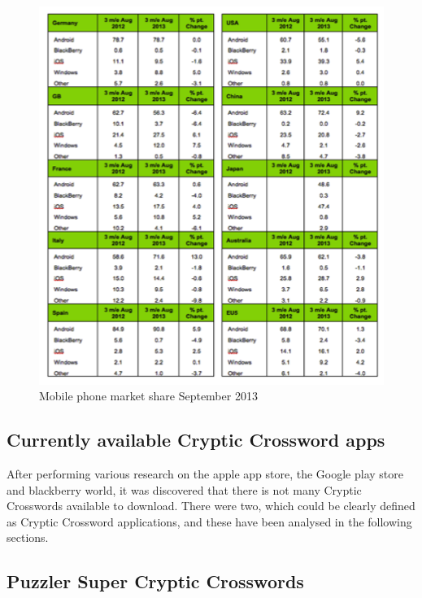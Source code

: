 \newpage
    \begin{figure}[H]
    \includegraphics[width=\linewidth]
        {research/mobile_platforms/forbeslist13.png}
    \caption{Mobile phone market share September 2013}
\end{figure}

\begin{flushright}
\citep{forbes13}
\end{flushright}

\subsection{Currently available Cryptic Crossword apps}

After performing various research on the apple app store, the Google play store
and blackberry world, it was discovered that there is not many Cryptic
Crosswords available to download. There were two, which could be clearly defined
as Cryptic Crossword applications, and these have been analysed in the following
sections.

\subsection{Puzzler Super Cryptic Crosswords}


